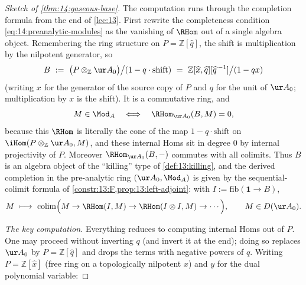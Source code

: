 \begin{proof}[Sketch of \cref{thm:14:gaseous-base}]
The computation runs through the completion formula from the end of
\cref{lec:13}. First rewrite the completeness condition
\eqref{eq:14:preanalytic-modules} as the vanishing of $\RHom$ out of a single
algebra object. Remembering the ring structure on $P=\mathbb{Z}[\widehat{q}]$, the
shift is multiplication by the nilpotent generator, so
\begin{equation*}
B\ :=\ \bigl(P\otimes_{\mathbb{Z}}\ur A_0\bigr)\big/(1-q\cdot\mathrm{shift})\ =\ \mathbb{Z}[\widehat{x},\widehat{q}][\widehat{q}^{\,-1}]\big/(1-qx)
\end{equation*}
(writing $x$ for the generator of the source copy of $P$ and $q$ for the unit of
$\ur A_0$; multiplication by $x$ is the shift). It is a commutative ring, and
\begin{equation*}
M\in\Mod_A\quad\Longleftrightarrow\quad \RHom_{\ur A_0}(B,M)=0,
\end{equation*}
because this $\RHom$ is literally the cone of the map
$1-q\cdot\mathrm{shift}$ on $\iHom(P\otimes_{\mathbb{Z}}\ur A_0,M)$, and these
internal Homs sit in degree $0$ by internal projectivity of $P$. Moreover
$\RHom_{\ur A_0}(B,-)$ commutes with all colimits. Thus $B$ is an algebra object of
the ``killing'' type of \cref{def:13:killing}, and the derived completion in the
pre-analytic ring $(\ur A_0,\Mod_A)$ is given by the sequential-colimit formula of
\cref{constr:13:F,prop:13:left-adjoint}: with $I:=\mathrm{fib}(\mathbf 1\to B)$,
\begin{equation}
\label{eq:14:completion-formula}
M\ \longmapsto\ \operatorname*{colim}\Bigl(M\to\RHom(I,M)\to\RHom(I\otimes I,M)\to\cdots\Bigr),\qquad M\in D(\ur A_0).
\end{equation}

\emph{The key computation.} Everything reduces to computing internal Homs out of
$P$. One may proceed without inverting $q$ (and invert it at the end); doing so
replaces $\ur A_0$ by $P=\mathbb{Z}[\widehat q]$ and drops the terms with negative
powers of $q$. Writing $P=\mathbb{Z}[\widehat x]$ (free ring on a topologically
nilpotent $x$) and $y$ for the dual polynomial variable:


\end{proof}
